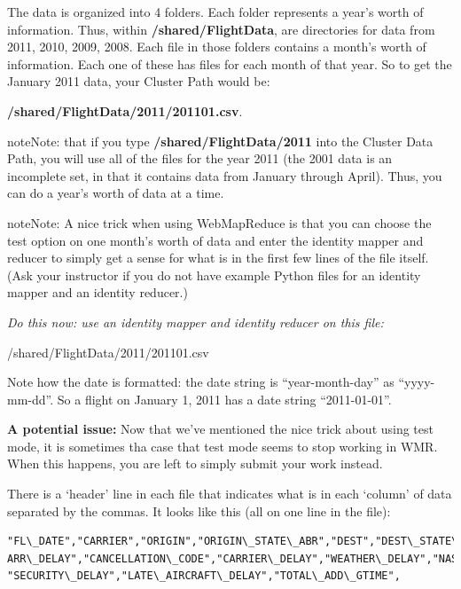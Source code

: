 \documentclass[letterpaper,10pt,openany,oneside]{sphinxmanual}
\begin{document}
The data is organized into 4 folders. Each folder represents a
year's worth of information. Thus, within \textbf{/shared/FlightData}, are directories for
data from 2011, 2010, 2009, 2008. Each file in those folders
contains a month's worth of information. Each one of these has
files for each month of that year. So to get the January 2011 data,
your Cluster Path would be:

\textbf{/shared/FlightData/2011/201101.csv}.

\begin{notice}{note}{Note:}
that if you type
\textbf{/shared/FlightData/2011}
into the Cluster Data Path, you will use all of the files for the
year 2011 (the 2001 data is an incomplete set, in that it contains
data from January through April). Thus, you can do a year's worth
of data at a time.
\end{notice}

\begin{notice}{note}{Note:}
A nice trick when using WebMapReduce is that you can choose
the test option on one month's worth of data and enter the identity
mapper and reducer to simply get a sense for what is in the first
few lines of the file itself. (Ask your instructor if you do not
have example Python files for an identity mapper and an identity
reducer.)
\end{notice}

\emph{Do this now: use an identity mapper and identity reducer on this  file:}

/shared/FlightData/2011/201101.csv

Note how the date is formatted: the date string is ``year-month-day''
as ``yyyy-mm-dd''. So a flight on January 1, 2011 has a date string
``2011-01-01''.

\textbf{A potential issue:} Now that we've mentioned the nice trick about
using test mode, it is sometimes tha case that test mode seems to
stop working in WMR. When this happens, you are left to simply
submit your work instead.

There is a `header' line in each file that indicates what is in
each `column' of data separated by the commas. It looks like this
(all on one line in the file):

\begin{Verbatim}[commandchars=\\\{\}]
"FL\_DATE","CARRIER","ORIGIN","ORIGIN\_STATE\_ABR","DEST","DEST\_STATE\_ABR","DEP\_DELAY","
ARR\_DELAY","CANCELLATION\_CODE","CARRIER\_DELAY","WEATHER\_DELAY","NAS\_DELAY",
"SECURITY\_DELAY","LATE\_AIRCRAFT\_DELAY","TOTAL\_ADD\_GTIME",
\end{Verbatim}
\end{document}
